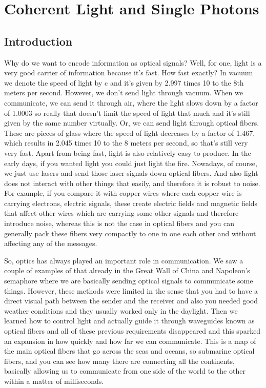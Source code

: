 \chapter{Coherent Light and Single Photons}

\section{Introduction}



Why do we want to encode information as optical signals? Well, for one, light is a very good carrier of information because it's fast. How fast exactly? In vacuum we denote the speed of light by c and it's given by 2.997 times 10 to the 8th meters per second. However, we don't send light through vacuum. When we communicate, we can send it through air, where the light slows down by a factor of 1.0003 so really that doesn't limit the speed of light that much and it's still given by the same number virtually. Or, we can send light through optical fibers. These are pieces of glass where the speed of light  decreases by a factor of 1.467, which results in 2.045 times 10 to the 8 meters per second, so that's still very very fast. Apart from being fast, light is also relatively easy to produce. In the early days, if you wanted light you could just light the fire. Nowadays, of course, we just use lasers and send those laser signals down optical fibers. And also light does not interact with other things that easily, and therefore it is robust to noise. For example, if you compare it with copper wires where each copper wire is carrying electrons, electric signals, these create electric fields and magnetic fields that affect other wires which are carrying some other signals and therefore introduce noise, whereas this is not the case in optical fibers and you can generally pack these fibers very compactly to one in one each other and without affecting any of the messages.

So, optics has always played an important role in communication. We saw a couple of examples of that already in the Great Wall of China and Napoleon's semaphore where we are basically sending optical signals to communicate some things. However, these methods were limited in the sense that you had to have a direct visual path between the sender and the receiver and also you needed good weather conditions and they usually worked only in the daylight. Then we learned how to control light and actually guide it through waveguides known as optical fibers and all of these previous requirements disappeared and this sparked an expansion in how quickly and how far we can communicate. This is a map of the main optical fibers that go across the seas and oceans, so submarine optical fibers, and you can see how many there are connecting all the continents, basically allowing us to communicate from one side of the world to the other within a matter of milliseconds.

